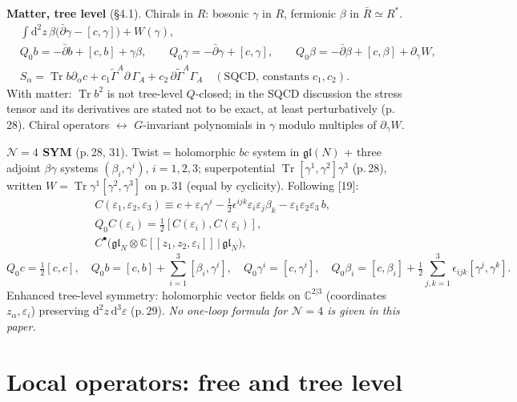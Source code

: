 \documentclass[11pt]{article}
\newcommand{\Tr}{\operatorname{Tr}}
\newcommand{\pb}{\bar{\partial}}
\begin{document}
\textbf{Matter, tree level} (§4.1). Chirals in $R$: bosonic $\gamma$ in $R$, fermionic $\beta$ in $\bar R\simeq R^*$.
\begin{align}
&\int\mathrm d^2z\,\beta\big(\pb\gamma-[c,\gamma]\big)+W(\gamma), \tag{4.1}\\
&Q_0b=-\pb b+[c,b]+\gamma\beta,\qquad Q_0\gamma=-\pb\gamma+[c,\gamma],\qquad Q_0\beta=-\pb\beta+[c,\beta]+\partial_\gamma W, \tag{4.2}\\
&S_\alpha=\Tr b\partial_\alpha c+c_1\tilde\Gamma^A\partial\,\Gamma_A+c_2\,\partial\tilde\Gamma^A\Gamma_A\quad(\text{SQCD, constants }c_1,c_2). \tag{4.3}
\end{align}
With matter: $\Tr b^2$ is not tree-level $Q$-closed; in the SQCD discussion the stress tensor and its derivatives are stated not to be exact, at least perturbatively (p.\,28). Chiral operators $\leftrightarrow$ $G$-invariant polynomials in $\gamma$ modulo multiples of $\partial_\gamma W$.

\textbf{$\mathcal N=4$ SYM} (p.\,28, 31). Twist = holomorphic $bc$ system in $\mathfrak{gl}(N)$ + three adjoint $\beta\gamma$ systems $(\beta_i,\gamma^i)$, $i=1,2,3$; superpotential $\Tr[\gamma^1,\gamma^2]\gamma^3$ (p.\,28), written $W=\Tr\gamma^1[\gamma^2,\gamma^3]$ on p.\,31 (equal by cyclicity). Following [19]:
\begin{align}
&C(\varepsilon_1,\varepsilon_2,\varepsilon_3)\equiv c+\varepsilon_i\gamma^i-\tfrac12\epsilon^{ijk}\varepsilon_i\varepsilon_j\beta_k-\varepsilon_1\varepsilon_2\varepsilon_3\,b, \tag{4.4}\\
&Q_0C(\varepsilon_i)=\tfrac12[C(\varepsilon_i),C(\varepsilon_i)], \tag{4.5}\\
&C^\bullet\big(\mathfrak{gl}_N\otimes\mathbb C[[z_1,z_2,\varepsilon_i]]\,|\,\mathfrak{gl}_N\big), \tag{4.6}
\end{align}
\begin{equation}
Q_0c=\tfrac12[c,c],\quad Q_0b=[c,b]+\sum_{i=1}^3[\beta_i,\gamma^i],\quad Q_0\gamma^i=[c,\gamma^i],\quad Q_0\beta_i=[c,\beta_i]+\tfrac12\sum_{j,k=1}^3\epsilon_{ijk}[\gamma^j,\gamma^k]. \tag{4.14}
\end{equation}
Enhanced tree-level symmetry: holomorphic vector fields on $\mathbb C^{2|3}$ (coordinates $z_\alpha,\varepsilon_i$) preserving $\mathrm d^2z\,\mathrm d^3\varepsilon$ (p.\,29). \emph{No one-loop formula for $\mathcal N=4$ is given in this paper.}

\section{Local operators: free and tree level}
\end{document}
